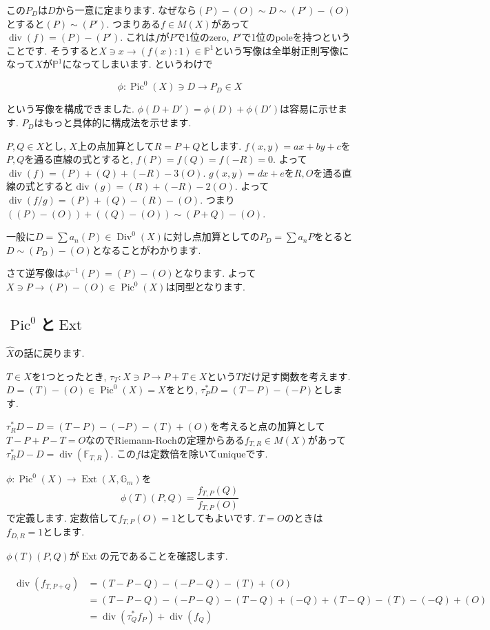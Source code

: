 \documentclass{jsarticle}
\newcommand{\FF}{\mathbb{F}}
\newcommand{\PP}{\mathbb{P}}
\newcommand{\GG}{\mathbb{G}}
\newcommand{\makeop}[1]{\mathop{\mathrm{#1}}\nolimits}
\def\Ext{\makeop{Ext}}
\def\Pic{\makeop{Pic}}
\def\Div{\makeop{Div}}
\def\div{\makeop{div}}
\theoremstyle{definition}
\numberwithin{theorem}{section}
\begin{document}
この$P_D$は$D$から一意に定まります. なぜなら$(P) - (O) \sim D \sim (P') - (O)$とすると$(P)\sim(P')$. つまりある$f\in M(X)$があって$\div(f) = (P) - (P')$. これは$f$が$P$で1位のzero, $P'$で1位のpoleを持つということです. そうすると$X \ni x \rightarrow (f(x):1) \in \PP^1$という写像は全単射正則写像になって$X$が$\PP^1$になってしまいます. というわけで

\begin{equation*}
\phi: \Pic^0(X) \ni D \rightarrow P_D \in X
\end{equation*}

という写像を構成できました. $\phi(D + D') = \phi(D) + \phi(D')$は容易に示せます. $P_D$はもっと具体的に構成法を示せます.

$P, Q \in X$とし, $X$上の点加算として$R = P+Q$とします. $f(x, y) = ax+by+c$を$P, Q$を通る直線の式とすると, $f(P) = f(Q) = f(-R) = 0$. よって$\div(f) = (P) + (Q) + (-R) - 3(O)$. $g(x, y) = dx+e$を$R, O$を通る直線の式とすると$\div(g) = (R) + (-R) - 2(O)$. よって$\div(f/g) = (P) + (Q) - (R) - (O)$. つまり$((P) - (O)) + ((Q) - (O)) \sim (P+Q) - (O)$.

一般に$D = \sum a_n(P) \in \Div^0(X)$に対し点加算としての$P_D = \sum a_n P$をとると$D \sim (P_D) - (O)$となることがわかります. 

さて逆写像は$\phi^{-1}(P) = (P) - (O)$となります. よって$X \ni P \rightarrow (P) - (O) \in \Pic^0(X)$は同型となります. 

\subsection{$\Pic^0$と$\Ext$}
$\hat{X}$の話に戻ります.

$T \in X$を1つとったとき, $\tau_T : X \ni P \rightarrow P+T \in X$という$T$だけ足す関数を考えます. $D = (T) - (O) \in \Pic^0(X) = X$をとり, $\tau_P^*D = (T-P) - (-P)$とします.

$\tau_R^*D - D = (T-P) - (-P) - (T) + (O)$を考えると点の加算として$T - P + P - T = O$なのでRiemann-Rochの定理からある$f_{T, R} \in M(X)$があって$\tau_R^*D - D = \div(\FF_{T, R})$.
この$f$は定数倍を除いてuniqueです.

$\phi: \Pic^0(X) \rightarrow \Ext(X, \GG_m)$を
\[
\phi(T)(P, Q) = \frac{f_{T, P}(Q)}{f_{T, P}(O)}
\]
で定義します. 定数倍して$f_{T, P}(O) = 1$としてもよいです. $T = O$のときは$f_{D, R} = 1$とします.

$\phi(T)(P, Q)$が$\Ext$の元であることを確認します.

\begin{eqnarray*}
\begin{aligned}
\div(f_{T, P+Q}) &= (T-P-Q) - (-P-Q) - (T) + (O)\\
&= (T-P-Q) - (-P-Q) - (T-Q) + (-Q) + (T-Q) - (T) - (-Q) + (O)\\
&= \div(\tau_Q^*f_P) + \div(f_Q)
\end{aligned}
\end{eqnarray*}
\end{document}
